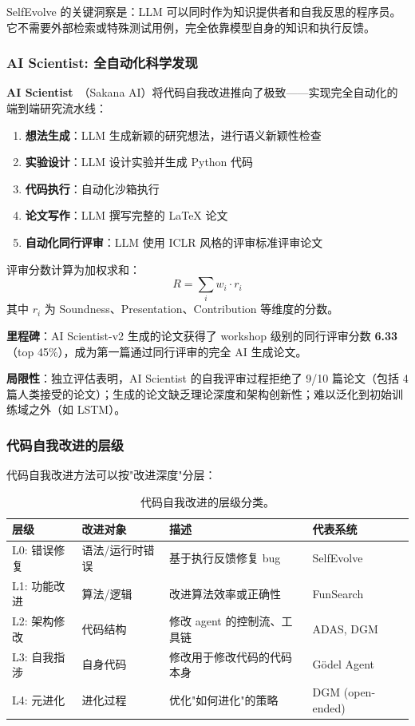 SelfEvolve 的关键洞察是：LLM 可以同时作为知识提供者和自我反思的程序员。它不需要外部检索或特殊测试用例，完全依靠模型自身的知识和执行反馈。

\subsubsection{AI Scientist: 全自动化科学发现}

\textbf{AI Scientist}~\citep{aiscientist2024}（Sakana AI）将代码自我改进推向了极致——实现完全自动化的端到端研究流水线：

\begin{enumerate}
\item \textbf{想法生成}：LLM 生成新颖的研究想法，进行语义新颖性检查
\item \textbf{实验设计}：LLM 设计实验并生成 Python 代码
\item \textbf{代码执行}：自动化沙箱执行
\item \textbf{论文写作}：LLM 撰写完整的 LaTeX 论文
\item \textbf{自动化同行评审}：LLM 使用 ICLR 风格的评审标准评审论文
\end{enumerate}

评审分数计算为加权求和：
\begin{equation}
R = \sum_i w_i \cdot r_i
\label{eq:aiscientist-score}
\end{equation}
其中 $r_i$ 为 Soundness、Presentation、Contribution 等维度的分数。

\textbf{里程碑}：AI Scientist-v2 生成的论文获得了 workshop 级别的同行评审分数 \textbf{6.33}（top 45\%），成为第一篇通过同行评审的完全 AI 生成论文。

\textbf{局限性}：独立评估表明，AI Scientist 的自我评审过程拒绝了 9/10 篇论文（包括 4 篇人类接受的论文）；生成的论文缺乏理论深度和架构创新性；难以泛化到初始训练域之外（如 LSTM）。

\subsubsection{代码自我改进的层级}

代码自我改进方法可以按"改进深度"分层：

\begin{table}[htbp]
\centering
\caption{代码自我改进的层级分类。}
\label{tab:code-evolve-levels}
\begin{tabular}{llp{50mm}l}
\toprule
\textbf{层级} & \textbf{改进对象} & \textbf{描述} & \textbf{代表系统} \\
\midrule
L0: 错误修复 & 语法/运行时错误 & 基于执行反馈修复 bug & SelfEvolve \\
L1: 功能改进 & 算法/逻辑 & 改进算法效率或正确性 & FunSearch \\
L2: 架构修改 & 代码结构 & 修改 agent 的控制流、工具链 & ADAS, DGM \\
L3: 自我指涉 & 自身代码 & 修改用于修改代码的代码本身 & Gödel Agent \\
L4: 元进化 & 进化过程 & 优化"如何进化"的策略 & DGM (open-ended) \\
\bottomrule
\end{tabular}
\end{table}

